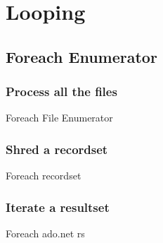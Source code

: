 \part{Looping}
\label{part:Looping}

\chapter{Foreach Enumerator}
\label{chap:Foreach Enumerator}

\section{Process all the files}
\label{sec:Process all the files}
Foreach File Enumerator

\section{Shred a recordset}
\label{sec:Shred a recordset}
Foreach recordset

\section{Iterate a resultset}
\label{sec:Iterate a resultset}
Foreach ado.net rs


